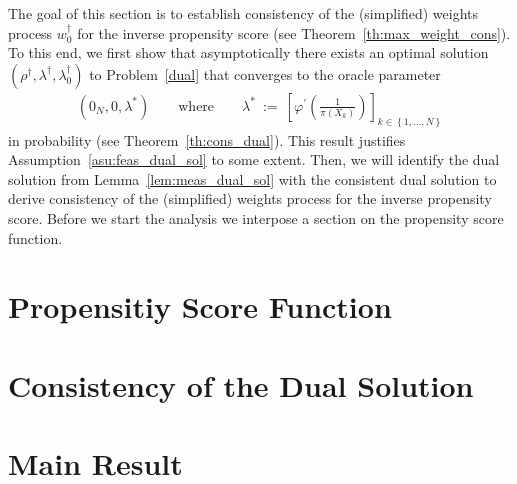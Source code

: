 The goal of this section is to establish consistency of the
(simplified) weights process $w_0^\dagger$ for the inverse propensity score (see Theorem~\ref{th:max_weight_cons}).
To this end,
we first show that asymptotically there exists an optimal solution 
$
(\rho^\dagger,\lambda^\dagger,\lambda_0^\dagger)
$
to Problem~\ref{dual} that converges to the oracle parameter
\begin{align*}
  (0_N,0,\lambda^*)
  \qquad
  \text{where}
  \qquad
  \lambda^*
  \ 
  :=
  \ 
\left[ 
\varphi^{'} \left( \frac{1}{\pi(X_k)} \right)
\right]_{k\in \left\{ 1,\ldots,N \right\}}
\end{align*}
in probability (see Theorem~\ref{th:cons_dual}).
This result justifies Assumption~\ref{asu:feas_dual_sol} to some extent.
Then, we will identify the dual solution from Lemma~\ref{lem:meas_dual_sol} 
with the consistent dual solution to derive consistency of the (simplified) weights process for the inverse propensity score.
Before we start the analysis we interpose a section on the propensity score function.
\section{Propensitiy Score Function}
  
\section{Consistency of the Dual Solution}
  
\section{Main Result}



